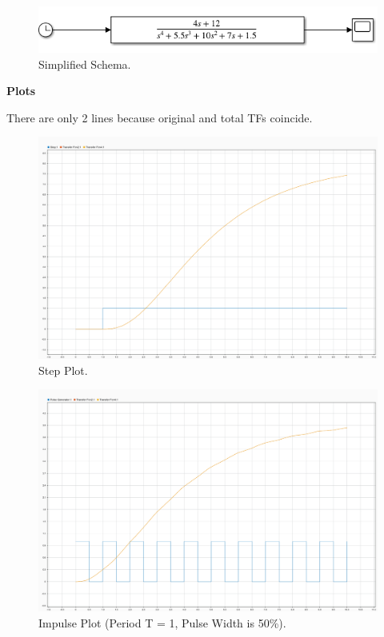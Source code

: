 \documentclass{article}
\begin{document}
        \begin{figure}[hbt!]
            \centering
            \includegraphics[scale=0.5]{ct_hm2_2_usualTFs.png}
            \caption{Simplified Schema.}
        \end{figure}
        
        
        \newpage
        
        \noindent
        \textbf{Plots}
        
        \smallbreak
        There are only 2 lines because original and total TFs coincide.
        
        \begin{figure}[hbt!]
            \centering
            \includegraphics[scale=0.3]{hm2_stepplot.png}
            \caption{Step Plot.}
        \end{figure}
        
        \begin{figure}[hbt!]
            \centering
            \includegraphics[scale=0.3]{hm2_impulseplot.png}
            \caption{Impulse Plot (Period T = 1, Pulse Width is 50\%).}
        \end{figure}
    
\end{document}
